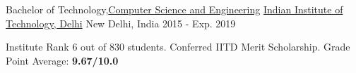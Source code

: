 

\begin{cventries}

  \cventry
    {Bachelor of Technology,\href{http://www.cse.iitd.ac.in/} {Computer Science and Engineering}} %
    {\href{http://www.iitd.ac.in/}{Indian Institute of Technology, Delhi}} %
    {New Delhi, India} %
    {2015 - Exp. 2019} %
    {
      \begin{cvitems} %
        \item {Institute Rank 6 out of 830 students. Conferred IITD Merit Scholarship. Grade Point Average: \textbf{9.67/10.0}}
      \end{cvitems}
    }

\end{cventries}
